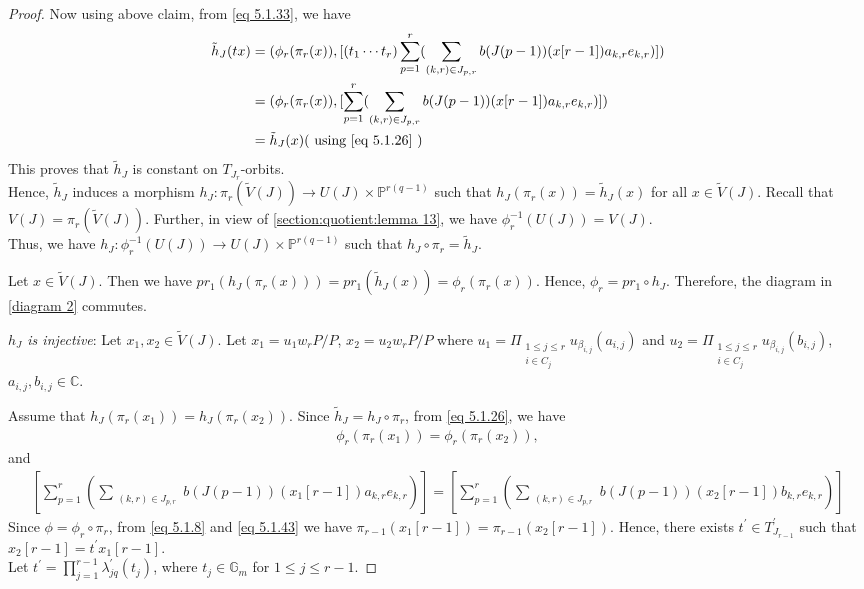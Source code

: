\documentclass[12pt,reqno]{amsart}
\numberwithin{equation}{section}
\theoremstyle{definition}
\begin{document}
\begin{proof}
			Now using above claim, from \cref{eq 5.1.33}, we have
			\begin{align*}
				\tilde{h}_{J}(tx)&=(\phi_{r}(\pi_{r}(x)),[(t_{1}\cdots t_{r})\sum_{p=1}^{r}(\sum_{\substack{(k,r)\in J_{p,r}}}b(J(p-1))(x[r-1])a_{k,r}e_{k,r})])\\
				&=(\phi_{r}(\pi_{r}(x)),[\sum_{p=1}^{r}(\sum_{\substack{(k,r)\in J_{p,r}}}b(J(p-1))(x[r-1])a_{k,r}e_{k,r})])\\
				&=\tilde{h}_{J}(x) (\text{\ using \cref{eq 5.1.26}\ })
			\end{align*}
			This proves that $\tilde{h}_{J}$ is constant on $T_{J_{r}}$-orbits.\\
			Hence, $\tilde{h}_{J}$
			induces a morphism  $h_{J}:\pi_{r}(\tilde{V}(J))\longrightarrow U(J)\times \mathbb{P}^{r(q-1)}$ such that $h_{J}(\pi_{r}(x))=\tilde{h}_{J}(x)$ for all $x\in \tilde{V}(J)$.
			Recall that $V(J)=\pi_{r}(\tilde{V}(J))$. Further, in view of \cref{section:quotient:lemma 13}, we have $\phi_{r}^{-1}(U(J))=V(J)$. \\
			Thus, we have $h_{J}:\phi_{r}^{-1}(U(J))\longrightarrow U(J)\times \mathbb{P}^{r(q-1)}$ such that $h_{J}\circ\pi_{r}=\tilde{h}_{J}$.
			
			Let $x\in  \tilde{V}(J)$. Then we have $pr_{1}(h_{J}(\pi_{r}(x)))=pr_{1}(\tilde{h}_{J}(x))=\phi_{r}(\pi_{r}(x))$. Hence, $\phi_{r}=pr_{1}\circ h_{J}$.
			Therefore, the diagram in \cref{diagram 2} commutes.
			
			{\it $h_{J}$ is injective}: Let $x_{1},x_{2}\in \tilde{V}(J)$. Let $x_{1}=u_{1}w_{r}P/P$, $x_{2}=u_{2}w_{r}P/P$ where $u_{1}=\Pi_{\substack{1\leq j\leq r\\i\in C_{j}}}u_{\beta_{i,j}}(a_{i,j})$ and $u_{2}=\Pi_{\substack{1\leq j\leq r\\i\in C_{j}}}u_{\beta_{i,j}}(b_{i,j})$, $a_{i,j},b_{i,j}\in\mathbb{C}$.
			
			Assume that $h_{J}(\pi_{r}(x_{1}))=h_{J}(\pi_{r}(x_{2}))$. Since $\tilde{h}_{J}=h_{J}\circ\pi_r$, from \cref{eq 5.1.26}, we have \begin{align}\label{eq 5.1.43}
				\phi_{r}(\pi_{r}(x_{1}))=\phi_{r}(\pi_{r}(x_{2})),
			\end{align}
		and
			\begin{align}\label{eq 5.1.19}
				[\sum_{p=1}^{r}(\sum_{\substack{(k,r)\in J_{p,r}}}b(J(p-1))(x_{1}[r-1])a_{k,r}e_{k,r})]=[\sum_{p=1}^{r}(\sum_{\substack{(k,r)\in J_{p,r}}}b(J(p-1))(x_{2}[r-1])b_{k,r}e_{k,r})]
			\end{align}
			Since $\phi=\phi_{r}\circ\pi_r$, from \cref{eq 5.1.8} and \cref{eq 5.1.43} we have $\pi_{r-1}(x_{1}[r-1])=\pi_{r-1}(x_{2}[r-1])$. Hence, there exists $t^{\prime}\in T^{\prime}_{J_{r-1}}$ such that $x_{2}[r-1]=t^{\prime}x_{1}[r-1]$.\\
			Let $t^{\prime}=\prod_{j=1}^{r-1}\lambda^{\prime}_{jq}(t_{j})$, where $t_{j}\in\mathbb{G}_{m}$ for $1\leq j\leq r-1$. 
			

\end{proof}
\end{document}
